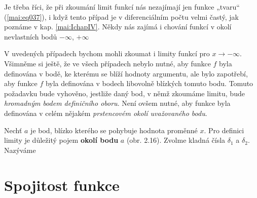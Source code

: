 {    %
      

    Je třeba říci, že při zkoumání limit funkcí nás nezajímají jen funkce „tvaru“ 
    (\ref{mai:eq037}), i když tento případ je v diferenciálním počtu velmi častý, jak poznáme v 
    kap. \ref{mai:IchapIV}. Někdy nás zajímá i chování funkcí v okolí nevlastních bodů \(-\infty\), 
    \(+\infty\) 

      
    
      
    
    V uvedených případech bychom mohli zkoumat i limity funkcí pro \(x \to - \infty\).  Všimněme si 
    ještě, že ve všech případech nebylo nutné, aby funkce \(f\) byla definována v bodě, ke kterému 
    se blíží hodnoty argumentu, ale bylo zapotřebí, aby funkce \(f\) byla definována v bodech 
    libovolně blízkých tomuto bodu. Tomuto požadavku bude vyhověno, jestliže daný bod, v němž 
    zkoumáme limitu, bude \emph{hromadným bodem definičního oboru}. Není ovšem nutné, aby funkce 
    byla definována v celém nějakém \emph{prstencovém okolí uvažovaného bodu}.
    
    Nechť \(a\) je bod, blízko kterého se pohybuje hodnota proměnné \(x\). Pro definici limity je 
    důležitý pojem \textbf{okolí bodu} \(a\) (obr. 2.16). Zvolme kladná čísla \(\delta_1\) a 
    \(\delta_2\). Nazýváme
    
    
      
  \section{Spojitost funkce}
  
} %
\printbibliography[title={Seznam literatury}, heading=subbibliography]
